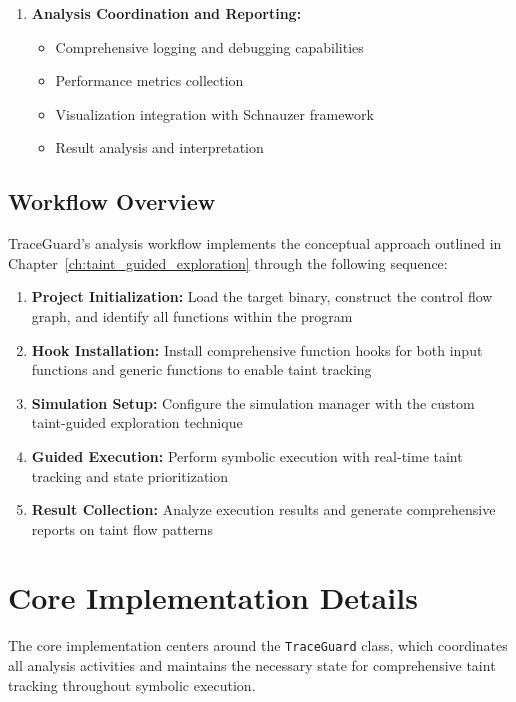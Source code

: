 \begin{enumerate}
    \item \textbf{Analysis Coordination and Reporting:}
        \begin{itemize}
            \item Comprehensive logging and debugging capabilities
            \item Performance metrics collection
            \item Visualization integration with Schnauzer framework
            \item Result analysis and interpretation
        \end{itemize}
\end{enumerate}

\subsection{Workflow Overview}

TraceGuard's analysis workflow implements the conceptual approach outlined in Chapter~\ref{ch:taint_guided_exploration} through the following sequence:

\begin{enumerate}
    \item \textbf{Project Initialization:} Load the target binary, construct the control flow graph, and identify all functions within the program
    \item \textbf{Hook Installation:} Install comprehensive function hooks for both input functions and generic functions to enable taint tracking
    \item \textbf{Simulation Setup:} Configure the simulation manager with the custom taint-guided exploration technique
    \item \textbf{Guided Execution:} Perform symbolic execution with real-time taint tracking and state prioritization
    \item \textbf{Result Collection:} Analyze execution results and generate comprehensive reports on taint flow patterns
\end{enumerate}

\section{Core Implementation Details}\label{sec:core_implementation}

The core implementation centers around the \texttt{TraceGuard} class, which coordinates all analysis activities and maintains the necessary state for comprehensive taint tracking throughout symbolic execution.

